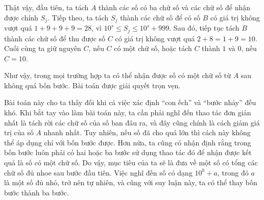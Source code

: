 \begin{vd}
\begin{enumerate}
		Thật vậy, đầu tiên, ta tách $A$ thành các số có ba chữ số và các chữ số để nhận được chính $S_j$. Tiếp theo, ta tách $S_j$ thành các chữ số để có số $B$ có giá trị không vượt quá $1+9+9+9=28$, vì $10^s\leq S_j \leq 10^s+999.$ Sau đó, tiếp tục tách $B$ thành các chữ số để thu được số $C$ có giá trị không vượt quá $2+8=1+9=10.$ Cuối cùng ta giữ nguyên $C$, nếu $C$ có một chữ số, hoặc tách $C$ thành $1$ và $0$, nếu $C=10$.
	\end{enumerate}
\noindent	Như vậy, trong mọi trường hợp ta có thể nhận được số có một chữ số từ $A$ sau không quá bốn bước. Bài toán được giải quyết trọn vẹn.
\end{vd} 

 Bài toán này cho ta thấy đối khi cả việc xác định “con ếch” và “bước nhảy” đều khó. Khi bắt tay vào làm bài toán này, ta cần phải nghĩ đến thao tác đơn giản nhất là tách rời các chữ số của số ban đâu ra, và đây cũng chính là cách giảm giá trị của số $A$ nhanh nhất. Tuy nhiên, nếu số đã cho quá lớn thì cách này không thể áp dụng chỉ với bốn bước được. Hơn nữa, ta cũng có nhận định rằng trong bốn bước luôn phải có hai hoặc ba bước sử dụng thao tác đó để nhận được kết quả là số có một chữ số. Do vậy, mục tiêu của ta sẽ là đưa về một số có tổng các chữ số đủ nhoe sau bước đầu tiên. Việc nghĩ đến số có dạng $10^k+a$, trong đó $a$ là một số đủ nhỏ, trở nên tự nhiên, và cũng với suy luận này, ta có thể thay bốn bước thành ba bước.	


